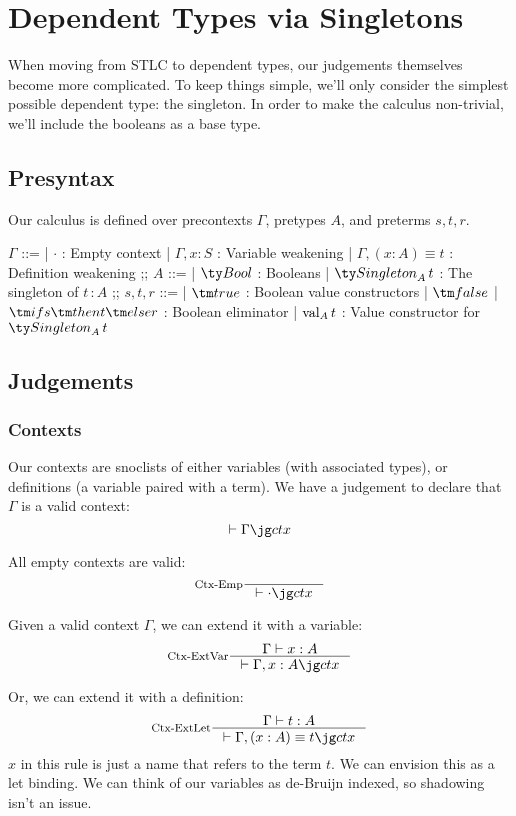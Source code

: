 \section{Dependent Types via Singletons}
When moving from STLC to dependent types, our judgements themselves become more complicated.
To keep things simple, we'll only consider the simplest possible dependent type: the singleton.
In order to make the calculus non-trivial, we'll include the booleans as a base type.

\subsection{Presyntax}
Our calculus is defined over precontexts $\Gamma$, pretypes $A$, and preterms $s, t, r$.

\begin{bnf}
$\Gamma$ ::=
  | $\cdot$ : Empty context
  | $\Gamma, x \colon S$ : Variable weakening
  | $\Gamma, (x \colon A) \equiv t$ : Definition weakening
;;
$A$ ::=
  | $\Bool$ : Booleans
  | $\Singleton[A][t]$ : The singleton of $t \,\colon A$
;;
$s, t, r$ ::=
| $\true$ : Boolean value constructors
| $\false$
| $\ite{s}{t}{r}$ : Boolean eliminator
| $\val[A][t]$ : Value constructor for $\Singleton[A][t]$
\end{bnf}


\subsection{Judgements}
\subsubsection{Contexts}
Our contexts are snoclists of either variables (with associated types), or definitions (a variable paired with a term).
We have a judgement to declare that $\Gamma$ is a valid context:
\[
  \vdash \ctx{\Gamma}
\]

All empty contexts are valid:
\[
  \inference[Ctx-Emp]{}{\vdash \ctx{\cdot}}
\]

Given a valid context $\Gamma$, we can extend it with a variable:
\[
  \inference[Ctx-ExtVar]
  {\Gamma \vdash x : A}
  {\vdash \ctx{\Gamma, x : A}}
\]

Or, we can extend it with a definition:
\[
  \inference[Ctx-ExtLet]
  {\Gamma \vdash t : A}
  {\vdash \ctx{\Gamma, (x : A) \equiv t}}
\]
$x$ in this rule is just a name that refers to the term $t$.
We can envision this as a let binding.
We can think of our variables as de-Bruijn indexed, so shadowing isn't an issue.

